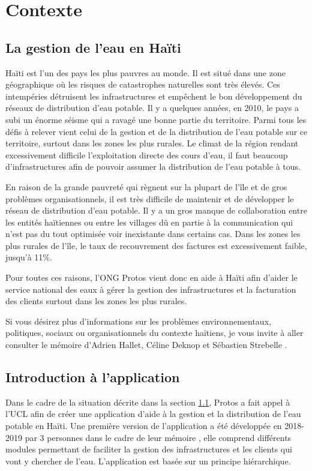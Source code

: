 \documentclass{EPL-master-thesis-covers-FR}
\begin{document}
	\chapter{Contexte}


		\section{La gestion de l'eau en Haïti}
			\label{sec:situation}
			
				Haïti est l'un des pays les plus pauvres au monde. Il est situé dans une zone géographique où les risques de catastrophes naturelles sont très élevés. Ces intempéries détruisent les infrastructures et empêchent le bon développement du réseaux de distribution d'eau potable. Il y a quelques années, en 2010, le pays a subi un énorme séisme qui a ravagé une bonne partie du territoire. Parmi tous les défis à relever vient celui de la gestion et de la distribution de l'eau potable sur ce territoire, surtout dans les zones les plus rurales. Le climat de la région rendant excessivement difficile l'exploitation directe des cours d'eau, il faut beaucoup d'infrastructures afin de pouvoir assumer la distribution de l'eau potable à tous.
				
				En raison de la grande pauvreté qui règnent sur la plupart de l'île et de gros problèmes organisationnels, il est très difficile de maintenir et de développer le réseau de distribution d'eau potable. Il y a un gros manque de collaboration entre les entités haïtiennes ou entre les villages dû en partie à la communication qui n'est pas du tout optimisée voir inexistante dans certains cas. Dans les zones les plus rurales de l'île, le taux de recouvrement des factures est excessivement faible, jusqu'à 11\%.
				
				Pour toutes ces raisons, l'ONG Protos vient donc en aide à Haïti afin d'aider le service national des eaux à gérer la gestion des infrastructures et la facturation des clients surtout dans les zones les plus rurales.
				
				Si vous désirez plus d'informations sur les problèmes environnementaux, politiques, sociaux ou organisationnels du contexte haïtiens, je vous invite à aller consulter le mémoire d'Adrien Hallet, Céline Deknop et Sébastien Strebelle \cite{ref:haitiwater}.



		\section{Introduction à l'application}
				Dans le cadre de la situation décrite dans la section \ref{sec:situation}, Protos a fait appel à l'UCL afin de créer une application d'aide à la gestion et la distribution de l'eau potable en Haïti. Une première version de l'application a été développée en 2018-2019 par 3 personnes dans le cadre de leur mémoire \cite{ref:haitiwater}, elle comprend différents modules permettant de faciliter la gestion des infrastructures et les clients qui vont y chercher de l'eau. L'application est basée sur un principe hiérarchique\cite{ref:haitiwater}.
				
\end{document}
